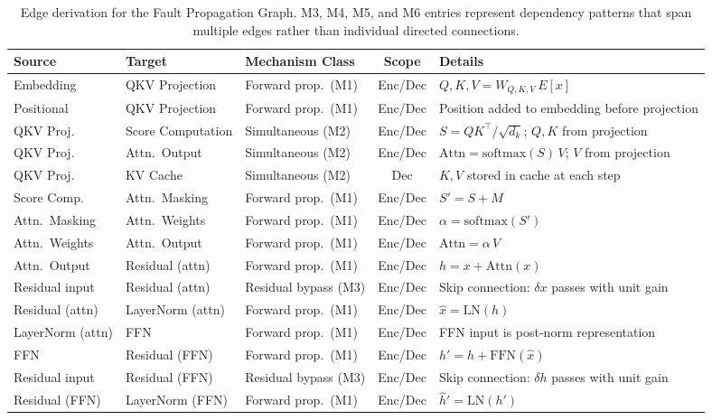 \begin{table}[!htbp]
\caption{Edge derivation for the Fault Propagation Graph. M3, M4, M5, and M6 entries represent dependency patterns that span multiple edges rather than individual directed connections.}
\label{tab:fpg_derivation}
\centering
\footnotesize
\renewcommand{\arraystretch}{1.0}
\begin{tabularx}{\textwidth}{@{} l l l c X @{}}
\toprule
\textbf{Source} & \textbf{Target} & \textbf{Mechanism Class} & \textbf{Scope} & \textbf{Details} \\
\midrule
Embedding & QKV Projection & Forward prop.\ (M1) & Enc/Dec & $Q,K,V = W_{Q,K,V}\, E[x]$ \\
Positional & QKV Projection & Forward prop.\ (M1) & Enc/Dec & Position added to embedding before projection \\
QKV Proj.\ & Score Computation & Simultaneous (M2) & Enc/Dec & $S = QK^\top\!/\sqrt{d_k}$; $Q,K$ from projection \\
QKV Proj.\ & Attn.\ Output & Simultaneous (M2) & Enc/Dec & $\text{Attn} = \text{softmax}(S)\,V$; $V$ from projection \\
QKV Proj.\ & KV Cache & Simultaneous (M2) & Dec & $K,V$ stored in cache at each step \\
Score Comp.\ & Attn.\ Masking & Forward prop.\ (M1) & Enc/Dec & $S' = S + M$ \\
Attn.\ Masking & Attn.\ Weights & Forward prop.\ (M1) & Enc/Dec & $\alpha = \text{softmax}(S')$ \\
Attn.\ Weights & Attn.\ Output & Forward prop.\ (M1) & Enc/Dec & $\text{Attn} = \alpha\, V$ \\
Attn.\ Output & Residual (attn) & Forward prop.\ (M1) & Enc/Dec & $h = x + \text{Attn}(x)$ \\
Residual input & Residual (attn) & Residual bypass (M3) & Enc/Dec & Skip connection: $\delta x$ passes with unit gain \\
Residual (attn) & LayerNorm (attn) & Forward prop.\ (M1) & Enc/Dec & $\hat{x} = \text{LN}(h)$ \\
LayerNorm (attn) & FFN & Forward prop.\ (M1) & Enc/Dec & FFN input is post-norm representation \\
FFN & Residual (FFN) & Forward prop.\ (M1) & Enc/Dec & $h' = h + \text{FFN}(\hat{x})$ \\
Residual input & Residual (FFN) & Residual bypass (M3) & Enc/Dec & Skip connection: $\delta h$ passes with unit gain \\
Residual (FFN) & LayerNorm (FFN) & Forward prop.\ (M1) & Enc/Dec & $\hat{h}' = \text{LN}(h')$ \\

\end{tabularx}
\end{table}
